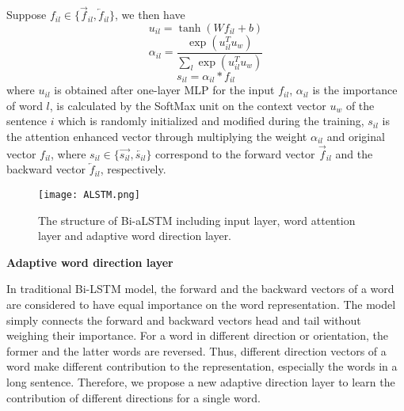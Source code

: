 \documentclass[10pt,sigconf]{acmart}
\begin{document}
Suppose $f_{il}\in \{\overrightarrow{f}_{il}, \overleftarrow{f}_{il}\}$, we then have
\begin{equation}
{{u}_{il}}=\tanh (W{{f}_{il}}+b)
\end{equation}
\begin{equation}
{{\alpha }_{il}}=\frac{\exp (u_{il}^{T}{{u}_{w}})}{\sum\limits_{l}{\exp (u_{il}^{T}{{u}_{w}})}}
\end{equation}
\begin{equation}
{{s}_{il}}={{\alpha }_{il}}*{{f}_{il}}
\end{equation}
where ${{u}_{il}}$ is obtained after one-layer MLP for the input $f_{il}$, ${{\alpha }_{il}}$ is the importance of word $l$, is calculated by the SoftMax unit on the context vector ${{u}_{w}}$ of the sentence $i$ which is randomly initialized and modified during the training, ${{s}_{il}}$ is the attention enhanced vector through multiplying the weight ${{\alpha }_{il}}$ and original vector ${{f}_{il}}$, where ${s}_{il}\in \{\overrightarrow{{s}_{il}}, \overleftarrow{{s}_{il}}\}$ correspond to the forward vector $\overrightarrow{f}_{il}$ and the backward vector $\overleftarrow{f}_{il}$, respectively.

\begin{figure}[t]
    \centering
    \texttt{[image: ALSTM.png]}
    \caption{The structure of Bi-aLSTM including input layer, word attention layer and adaptive word direction layer.}
    \label{fig:ALSTM-figl}
\end{figure}

\textbf{Adaptive word direction layer}

In traditional Bi-LSTM model, the forward and the backward vectors of a word are considered to have equal importance on the word representation. The model simply connects the forward and backward vectors head and tail without weighing their importance. For a word in different direction or orientation, the former and the latter words are reversed. Thus, different direction vectors of a word make different contribution to the representation, especially the words in a long sentence. Therefore, we propose a new adaptive direction layer to learn the contribution of different directions for a single word.
\end{document}
